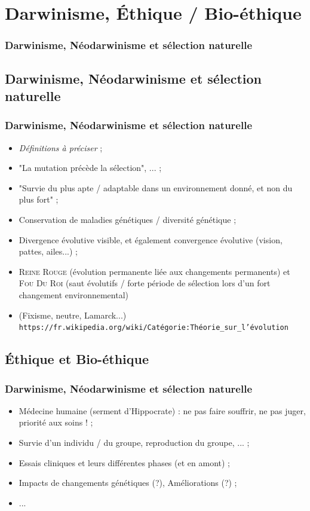 \documentclass{beamer}
\begin{document}

\section{Darwinisme, {\'E}thique / Bio-{\'e}thique }
\begin{frame}
	\frametitle{Darwinisme, N{\'e}odarwinisme et s{\'e}lection naturelle }
	\tableofcontents[sections=5,currentsection,subsectionstyle=show/shaded/hide]
\end{frame} 

\subsection{ Darwinisme, N{\'e}odarwinisme et s{\'e}lection naturelle }
\begin{frame}
	\frametitle{ Darwinisme, N{\'e}odarwinisme et s{\'e}lection naturelle }
	\begin{itemize}
		\item \emph{D{\'e}finitions {\`a} pr{\'e}ciser} ; 
		\item "La mutation pr{\'e}c{\`e}de la s{\'e}lection", ... ; 
		\item "Survie du plus apte / adaptable dans un environnement donn{\'e}, et non du plus fort" ; 
		\item Conservation de maladies g{\'e}n{\'e}tiques / diversit{\'e} g{\'e}n{\'e}tique ; 
		\item Divergence {\'e}volutive visible, et {\'e}galement convergence {\'e}volutive (vision, pattes, ailes...) ; 
		\item \textsc{Reine Rouge} ({\'e}volution permanente li{\'e}e aux changements permanents) et \textsc{Fou Du Roi} (saut {\'e}volutifs / forte p{\'e}riode de s{\'e}lection lors d'un fort changement environnemental)
		\item (Fixisme, neutre, Lamarck...) \texttt{https://fr.wikipedia.org/wiki/Cat{\'e}gorie:Th{\'e}orie\_sur\_l'{\'e}volution} 
	\end{itemize}
\end{frame}

\subsection{ {\'E}thique et Bio-{\'e}thique }
\begin{frame}
	\frametitle{ Darwinisme, N{\'e}odarwinisme et s{\'e}lection naturelle }
	\begin{itemize}
		\item M{\'e}decine humaine (serment d'Hippocrate) : ne pas faire souffrir, ne pas juger, priorit{\'e} aux soins ! ; 
		\item Survie d'un individu / du groupe, reproduction du groupe, ... ; 
		\item Essais cliniques et leurs diff{\'e}rentes phases (et en amont) ; 
		\item Impacts de changements g{\'e}n{\'e}tiques (?), Am{\'e}liorations (?) ; 
		\item ... 
	\end{itemize}
\end{frame}
\end{document}
